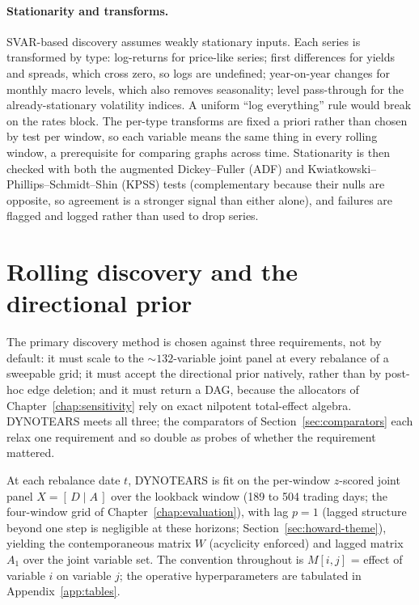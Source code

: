 \paragraph{Stationarity and transforms.} SVAR-based discovery assumes weakly
stationary inputs. Each series is transformed by type: log-returns for
price-like series; first differences for yields and spreads, which cross zero,
so logs are undefined; year-on-year changes for monthly macro levels, which
also removes seasonality; level pass-through for the already-stationary
volatility indices. A uniform ``log everything'' rule would break on the
rates block. The per-type transforms are fixed a priori rather than
chosen by test per window, so each variable means the same thing in every
rolling window, a prerequisite for comparing graphs across time.
Stationarity is then checked with both the augmented Dickey--Fuller (ADF)
and Kwiatkowski--Phillips--Schmidt--Shin (KPSS) tests (complementary because
their nulls are opposite, so agreement is a stronger signal than either
alone), and failures are flagged and logged rather than used to drop
series.

\section{Rolling discovery and the directional prior}
\label{sec:discovery-run}

The primary discovery method is chosen against three requirements, not by
default: it must scale to the ${\sim}132$-variable joint panel at every
rebalance of a sweepable grid; it must accept the directional prior
natively, rather than by post-hoc edge deletion; and it must return
a DAG, because the allocators of Chapter~\ref{chap:sensitivity} rely
on exact nilpotent total-effect algebra. DYNOTEARS meets all three; the
comparators of Section~\ref{sec:comparators} each relax one requirement and
so double as probes of whether the requirement mattered.

At each rebalance date $t$, DYNOTEARS \cite{pamfil2020dynotears} is fit on the
per-window $z$-scored joint panel $X=[\,D \mid A\,]$ over the lookback window
(189 to 504 trading days; the four-window grid of
Chapter~\ref{chap:evaluation}), with lag $p=1$ (lagged structure beyond one
step is negligible at these horizons; Section~\ref{sec:howard-theme}),
yielding the contemporaneous matrix
$W$ (acyclicity enforced) and lagged matrix $A_1$ over the joint variable set.
The convention throughout is $M[i,j]$ = effect of variable $i$ on variable
$j$; the operative hyperparameters are tabulated in
Appendix~\ref{app:tables}.

